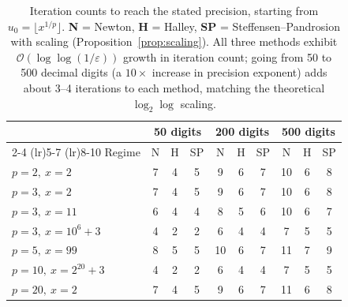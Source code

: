 \documentclass[11pt,a4paper]{article}
\theoremstyle{definition}
\begin{document}
\begin{table}[H]
\centering
\small
\renewcommand{\arraystretch}{1.15}
\begin{tabular}{@{}lccccccccc@{}}
\toprule
& \multicolumn{3}{c}{\textbf{50 digits}} & \multicolumn{3}{c}{\textbf{200 digits}} & \multicolumn{3}{c}{\textbf{500 digits}} \\
\cmidrule(lr){2-4} \cmidrule(lr){5-7} \cmidrule(lr){8-10}
Regime & N & H & SP & N & H & SP & N & H & SP \\
\midrule
$p=2,\ x=2$             & 7 & 4 & 5 & 9  & 6 & 7 & 10 & 6 & 8 \\
$p=3,\ x=2$             & 7 & 4 & 5 & 9  & 6 & 7 & 10 & 6 & 8 \\
$p=3,\ x=11$            & 6 & 4 & 4 & 8  & 5 & 6 & 10 & 6 & 7 \\
$p=3,\ x=10^6+3$        & 4 & 2 & 2 & 6  & 4 & 4 & 7  & 5 & 5 \\
$p=5,\ x=99$            & 8 & 5 & 5 & 10 & 6 & 7 & 11 & 7 & 9 \\
$p=10,\ x=2^{20}+3$     & 4 & 2 & 2 & 6  & 4 & 4 & 7  & 5 & 5 \\
$p=20,\ x=2$            & 7 & 4 & 5 & 9  & 6 & 7 & 11 & 6 & 8 \\
\bottomrule
\end{tabular}
\caption{Iteration counts to reach the stated precision, starting from $u_0 = \lfloor x^{1/p} \rfloor$. \textbf{N} = Newton, \textbf{H} = Halley, \textbf{SP} = Steffensen--Pandrosion with scaling (Proposition~\ref{prop:scaling}). All three methods exhibit $\mathcal{O}(\log\log(1/\varepsilon))$ growth in iteration count; going from 50 to 500 decimal digits (a $10\times$ increase in precision exponent) adds about 3--4 iterations to each method, matching the theoretical $\log_2\log$ scaling.}
\label{tab:benchmark}
\end{table}
\end{document}
